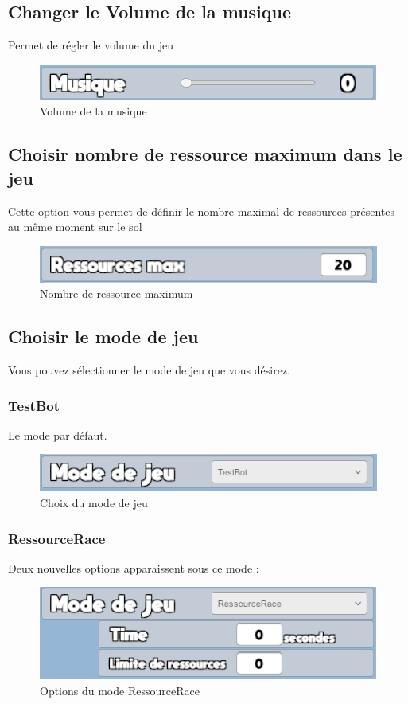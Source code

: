 \documentclass{report}
\begin{document}
\subsection{Changer le Volume de la musique}
Permet de régler le volume du jeu
\begin{figure}[!h]
	\centering
		\includegraphics[scale=0.80]{Control_Musique}
	\caption{Volume de la musique}
\end{figure}


\subsection{Choisir nombre de ressource maximum dans le jeu}
Cette option vous permet de définir le nombre maximal de ressources présentes au même moment sur le sol
\begin{figure}[!h]
	\centering
		\includegraphics[scale=0.80]{Limite_Ressources}
	\caption{Nombre de ressource maximum}
\end{figure}


\subsection{Choisir le mode de jeu}
Vous pouvez sélectionner le mode de jeu que vous désirez.
\subsubsection{TestBot}
Le mode par défaut.
\begin{figure}[!h]
	\centering
		\includegraphics[scale=0.80]{ModeJeuTestBot}
	\caption{Choix du mode de jeu}
\end{figure}


\subsubsection{RessourceRace}
Deux nouvelles options apparaissent sous ce mode :
\begin{figure}[!h]
	\centering
		\includegraphics[scale=0.80]{ModeJeuRessourceRace}
	\caption{Options du mode RessourceRace}
\end{figure}
\end{document}
